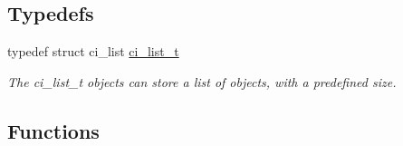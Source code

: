 \subsection*{Typedefs}
\begin{DoxyCompactItemize}
\item 
typedef struct ci\_\-list \hyperlink{group__LISTS_ga785498c08d3d0440e1403146d0dfdb57}{ci\_\-list\_\-t}
\begin{DoxyCompactList}\small\item\em The ci\_\-list\_\-t objects can store a list of objects, with a predefined size. \item\end{DoxyCompactList}\end{DoxyCompactItemize}
\subsection*{Functions}
